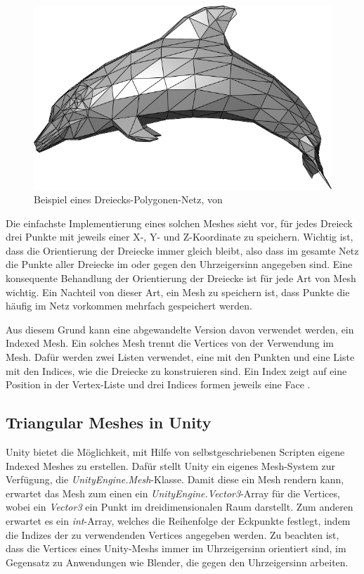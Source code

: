 \begin{figure}[h]
	\centering
	\includegraphics[width=0.7\linewidth]{Images/Dolphin_triangle_mesh}
	\caption[Beispiel eines Polygonen-Netzes]{Beispiel eines Dreiecks-Polygonen-Netz, von \cite{WikipediaDolphin1}}
	\label{fig:dolphintrianglemesh}
\end{figure}


Die einfachste Implementierung eines solchen Meshes sieht vor, f\"ur jedes Dreieck drei Punkte mit jeweils einer X-, Y- und Z-Koordinate zu speichern. Wichtig ist, dass die Orientierung der Dreiecke immer gleich bleibt, also dass im gesamte Netz die Punkte aller Dreiecke im oder gegen den Uhrzeigersinn angegeben sind. Eine konsequente Behandlung der Orientierung der Dreiecke ist f\"ur jede Art von Mesh wichtig. Ein Nachteil von dieser Art, ein Mesh zu speichern ist, dass Punkte die h\"aufig im Netz vorkommen mehrfach gespeichert werden. 

Aus diesem Grund kann eine abgewandelte Version davon verwendet werden, ein Indexed Mesh. Ein solches Mesh trennt die Vertices von der Verwendung im Mesh. Daf\"ur werden zwei Listen verwendet, eine mit den Punkten und eine Liste mit den Indices, wie die Dreiecke zu konstruieren sind. Ein Index zeigt auf eine Position in der Vertex-Liste und drei Indices formen jeweils eine Face \cite[S.265]{Shirley2010}.

\subsection{Triangular Meshes in Unity}
Unity bietet die M\"oglichkeit, mit Hilfe von selbstgeschriebenen Scripten eigene Indexed Meshes zu erstellen. Daf\"ur stellt Unity ein eigenes Mesh-System zur Verf\"ugung, die \textit{UnityEngine.Mesh}-Klasse. Damit diese ein Mesh rendern kann, erwartet das Mesh zum einen ein \textit{UnityEngine.Vector3}-Array f\"ur die Vertices, wobei ein \textit{Vector3} ein Punkt im dreidimensionalen Raum darstellt. Zum anderen erwartet es ein \textit{int}-Array, welches die Reihenfolge der Eckpunkte festlegt, indem die Indizes der zu verwendenden Vertices angegeben werden. Zu beachten ist, dass die Vertices eines Unity-Meshs immer im Uhrzeigersinn orientiert sind, im Gegensatz zu Anwendungen wie Blender, die gegen den Uhrzeigersinn arbeiten.
  
